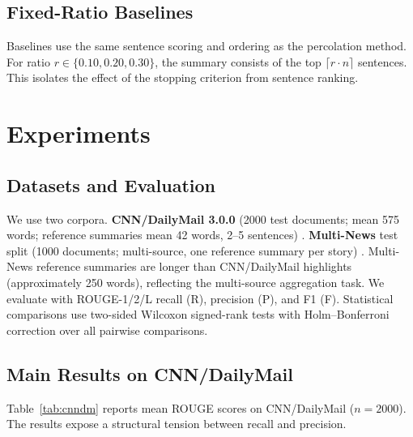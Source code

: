 \documentclass[11pt,letterpaper]{article}
\begin{document}
\subsection{Fixed-Ratio Baselines}

Baselines use the same sentence scoring and ordering as the percolation method. For ratio
$r \in \{0.10, 0.20, 0.30\}$, the summary consists of the top $\lceil r \cdot n \rceil$
sentences. This isolates the effect of the stopping criterion from sentence ranking.

\section{Experiments}
\label{sec:experiments}

\subsection{Datasets and Evaluation}

We use two corpora. \textbf{CNN/DailyMail 3.0.0} (2000 test documents; mean 575 words;
reference summaries mean 42 words, 2--5 sentences) \citep{Hermann2015}.
\textbf{Multi-News} test split (1000 documents; multi-source, one reference summary per
story) \citep{Fabbri2019}. Multi-News reference summaries are longer than CNN/DailyMail
highlights (approximately 250 words), reflecting the multi-source aggregation task. We
evaluate with ROUGE-1/2/L recall (R), precision (P), and F1 (F). Statistical
comparisons use two-sided Wilcoxon signed-rank tests with Holm--Bonferroni correction
over all pairwise comparisons.

\subsection{Main Results on CNN/DailyMail}

Table~\ref{tab:cnndm} reports mean ROUGE scores on CNN/DailyMail ($n=2000$). The results
expose a structural tension between recall and precision.
\end{document}

